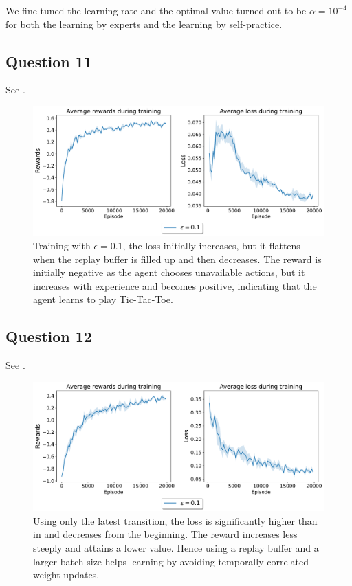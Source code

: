 \documentclass[10pt]{IEEEtran}
\begin{document}
We fine tuned the learning rate and the optimal value turned out to be $\alpha = 10^{-4}$ for both the learning by experts and the learning by self-practice.

\subsection*{Question 11}
See .
\begin{figure}[h]
    \centering
    \includegraphics[width = \linewidth]{code/figures/rewards_epsilon_exploration_Q11.pdf}
    \caption{Training with $\epsilon = 0.1$, the loss initially increases, but it flattens when the replay buffer is filled up and then decreases. The reward is initially negative as the agent chooses unavailable actions, but it increases with experience and becomes positive, indicating that the agent learns to play Tic-Tac-Toe.}
    \label{plot_question11}
\end{figure}

\subsection*{Question 12}
See . 
\begin{figure}[h]
    \centering
    \includegraphics[width = \linewidth]{code/figures/rewards_epsilon_exploration_Q12.pdf}
    \caption{Using only the latest transition, the loss is significantly higher than in  and decreases from the beginning. The reward increases less steeply and attains a lower value. Hence using a replay buffer and a larger batch-size helps learning by avoiding temporally correlated weight updates.}
    \label{plot_question12}
\end{figure}
\end{document}

